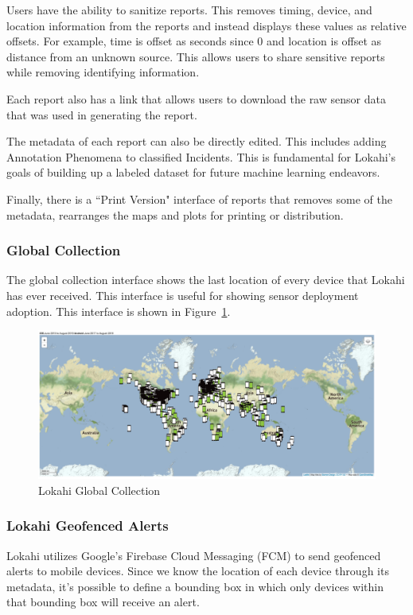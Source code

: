 Users have the ability to sanitize reports. This removes timing, device, and location information from the reports and instead displays these values as relative offsets. For example, time is offset as seconds since 0 and location is offset as distance from an unknown source. This allows users to share sensitive reports while removing identifying information.

Each report also has a link that allows users to download the raw sensor data that was used in generating the report.

The metadata of each report can also be directly edited. This includes adding Annotation Phenomena to classified Incidents. This is fundamental for Lokahi's goals of building up a labeled dataset for future machine learning endeavors.

Finally, there is a ``Print Version" interface of reports that removes some of the metadata, rearranges the maps and plots for printing or distribution.

\subsubsection{Global Collection}
The global collection interface shows the last location of every device that Lokahi has ever received. This interface is useful for showing sensor deployment adoption. This interface is shown in Figure~\ref{fig:lweb_global}.

\begin{figure}
	\centering
	\includegraphics[width=0.7\linewidth]{figures/lweb_global.jpg}
	\caption{Lokahi Global Collection}
	\label{fig:lweb_global}
\end{figure}

\subsubsection{Lokahi Geofenced Alerts}
Lokahi utilizes Google's Firebase Cloud Messaging (FCM) to send geofenced alerts to mobile devices. Since we know the location of each device through its metadata, it's possible to define a bounding box in which only devices within that bounding box will receive an alert.

